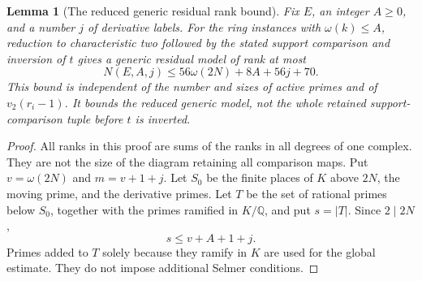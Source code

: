 \documentclass[11pt]{article}
\newtheorem{lemma}[theorem]{Lemma}
\theoremstyle{definition}
\theoremstyle{remark}
\newcommand{\Q}{\mathbb Q}
\begin{document}
\begin{lemma}[The reduced generic residual rank bound]\label{ex:limits-residual-bound}
Fix $E$, an integer $A\geq0$, and a number $j$ of derivative labels.
For the ring instances with $\omega(k)\leq A$, reduction to
characteristic two followed by the stated support comparison
and inversion of $t$ gives a generic residual model of rank at most
\[
 N(E,A,j)\leq56\omega(2N)+8A+56j+70.
\]
This bound is independent of the number and sizes of active primes
and of $v_2(r_i-1)$. It bounds the reduced generic model, not the
whole retained support-comparison tuple before $t$ is inverted.
\end{lemma}
\begin{proof}\leavevmode
All ranks in this proof are sums of the ranks in all degrees of one
complex. They are not the size of the diagram retaining all comparison
maps. Put $v=\omega(2N)$ and $m=v+1+j$. Let $S_0$ be the finite
places of $K$ above $2N$, the moving prime, and the derivative primes.
Let $T$ be the set of rational primes below $S_0$, together with the
primes ramified in $K/\Q$, and put $s=|T|$. Since $2\mid2N$,
\[
                    s\le v+A+1+j.                            \tag{5.1a}
\]
Primes added to $T$ solely because they ramify in $K$ are used for
the global estimate. They do not impose additional Selmer conditions.


\end{proof}
\end{document}
